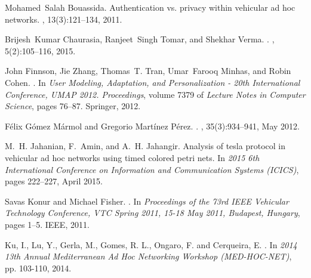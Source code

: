 \documentclass[compsoc, conference, letterpaper, 10pt, times]{IEEEtran}
\begin{document}
%
%
%

\begin{thebibliography}{10}
Mohamed~Salah Bouassida.
\newblock Authentication vs. privacy within vehicular ad hoc networks.
, 13(3):121--134,
  2011.

Brijesh~Kumar Chaurasia, Ranjeet~Singh Tomar, and Shekhar Verma.
.
, 5(2):105--116, 2015.

John Finnson, Jie Zhang, Thomas~T. Tran, Umar~Farooq Minhas, and Robin Cohen.
.
\newblock In {\em {User Modeling, Adaptation, and Personalization - 20th
  International Conference, {UMAP} 2012.
  Proceedings}}, volume 7379 of {\em {Lecture Notes in Computer Science}},
  pages 76--87. Springer, 2012.

F{\'e}lix {G{\'o}mez M{\'a}rmol} and Gregorio {Mart{\'i}nez P{\'e}rez}.
.
, 35(3):934--941, May 2012.

M.~H. Jahanian, F.~Amin, and A.~H. Jahangir.
\newblock Analysis of tesla protocol in vehicular ad hoc networks using timed
  colored petri nets.
\newblock In {\em 2015 6th International Conference on Information and
  Communication Systems (ICICS)}, pages 222--227, April 2015.

Savas Konur and Michael Fisher.
.
\newblock In {\em {Proceedings of the 73rd {IEEE} Vehicular Technology
  Conference, {VTC} Spring 2011, 15-18 May 2011, Budapest, Hungary}}, pages
  1--5. {IEEE}, 2011.
  
  
  
Ku, I., Lu, Y., Gerla, M., Gomes,  R. L., Ongaro, F. and Cerqueira, E. 
.
\newblock In \textit{2014 13th Annual Mediterranean Ad Hoc Networking Workshop (MED-HOC-NET)}, pp. 103-110,  2014.


\end{thebibliography}
\end{document}
